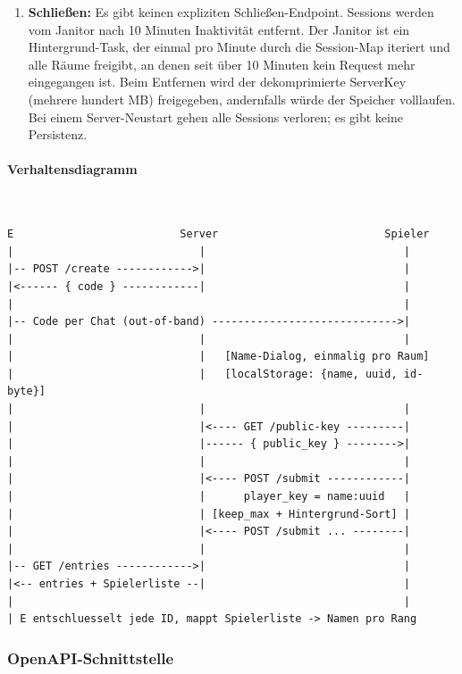 \begin{enumerate}
    \item \textbf{Schließen:} Es gibt keinen expliziten Schließen-Endpoint. Sessions werden vom Janitor nach 10 Minuten Inaktivität entfernt. Der Janitor ist ein Hintergrund-Task, der einmal pro Minute durch die Session-Map iteriert und alle Räume freigibt, an denen seit über 10 Minuten kein Request mehr eingegangen ist. Beim Entfernen wird der dekomprimierte ServerKey (mehrere hundert MB) freigegeben, andernfalls würde der Speicher volllaufen. Bei einem Server-Neustart gehen alle Sessions verloren; es gibt keine Persistenz.
\end{enumerate}

\paragraph{Verhaltensdiagramm}\mbox{}\\
\begin{lstlisting}[basicstyle=\ttfamily\small,breaklines=true]
E                          Server                          Spieler
|                             |                               |
|-- POST /create ------------>|                               |
|<------ { code } ------------|                               |
|                                                             |
|-- Code per Chat (out-of-band) ----------------------------->|
|                             |                               |
|                             |   [Name-Dialog, einmalig pro Raum]
|                             |   [localStorage: {name, uuid, id-byte}]
|                             |                               |
|                             |<---- GET /public-key ---------|
|                             |------ { public_key } -------->|
|                             |                               |
|                             |<---- POST /submit ------------|
|                             |      player_key = name:uuid   |
|                             | [keep_max + Hintergrund-Sort] |
|                             |<---- POST /submit ... --------|
|                             |                               |
|-- GET /entries ------------>|                               |
|<-- entries + Spielerliste --|                               |
|                                                             |
| E entschluesselt jede ID, mappt Spielerliste -> Namen pro Rang
\end{lstlisting}

\subsubsection{OpenAPI-Schnittstelle}

